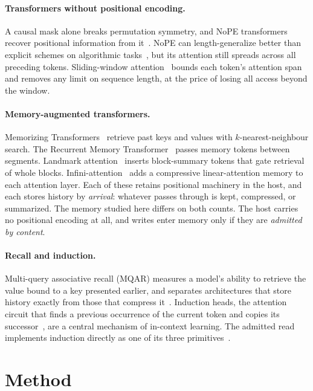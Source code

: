\documentclass[11pt]{article}
\begin{document}
\paragraph{Transformers without positional encoding.}
A causal mask alone breaks permutation symmetry, and NoPE transformers recover
positional information from it~\citep{haviv2022transformer}. NoPE can
length-generalize better than explicit schemes on algorithmic
tasks~\citep{kazemnejad2023impact}, but its attention still spreads across all
preceding tokens. Sliding-window attention~\citep{beltagy2020longformer} bounds
each token's attention span and removes any limit on sequence length, at the price
of losing all access beyond the window.

\paragraph{Memory-augmented transformers.}
Memorizing Transformers~\citep{wu2022memorizing} retrieve past keys and values
with $k$-nearest-neighbour search. The Recurrent Memory
Transformer~\citep{bulatov2022recurrent} passes memory tokens between segments.
Landmark attention~\citep{mohtashami2023landmark} inserts block-summary tokens
that gate retrieval of whole blocks. Infini-attention~\citep{munkhdalai2024leave}
adds a compressive linear-attention memory to each attention layer. Each of these
retains positional machinery in the host, and each stores history by
\emph{arrival}: whatever passes through is kept, compressed, or summarized. The
memory studied here differs on both counts. The host carries no positional
encoding at all, and writes enter memory only if they are \emph{admitted by
content}.

\paragraph{Recall and induction.}
Multi-query associative recall (MQAR) measures a model's ability to retrieve the
value bound to a key presented earlier, and separates architectures that store
history exactly from those that compress it~\citep{arora2024zoology}. Induction
heads, the attention circuit that finds a previous occurrence of the current token
and copies its successor~\citep{olsson2022context}, are a central mechanism of
in-context learning. The admitted read implements induction directly as one of its
three primitives~\citep{rosdahl2026dabsn}.

\section{Method}
\label{sec:method}
\end{document}
